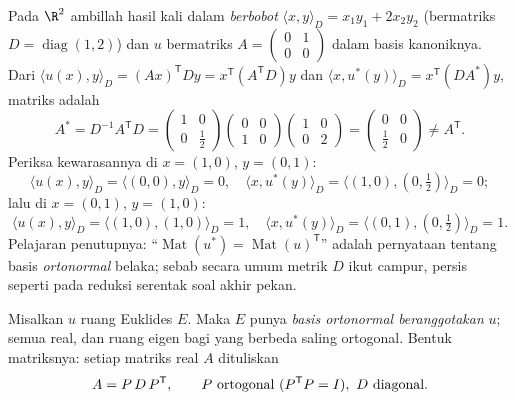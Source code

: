 \begin{example}\label{ex:b2:quadratic:weightedadjoint}
Pada $\R^2$ ambillah hasil kali dalam \emph{berbobot} $\langle x,
y\rangle_D = x_1y_1 + 2x_2y_2$ (bermatriks $D =
\operatorname{diag}(1,2)$) dan $u$ bermatriks $A =
\begin{pmatrix} 0 & 1\\ 0 & 0\end{pmatrix}$ dalam basis
kanoniknya. Dari $\langle u(x), y\rangle_D = (Ax)^{\mathsf T}Dy =
x^{\mathsf T}(A^{\mathsf T}D)y$ dan $\langle x, u^*(y)\rangle_D
= x^{\mathsf T}(DA^*)y$, matriks  adalah
\[
A^* = D^{-1}A^{\mathsf T}D
= \begin{pmatrix} 1 & 0\\ 0 & \tfrac12\end{pmatrix}
\begin{pmatrix} 0 & 0\\ 1 & 0\end{pmatrix}
\begin{pmatrix} 1 & 0\\ 0 & 2\end{pmatrix}
= \begin{pmatrix} 0 & 0\\ \tfrac12 & 0\end{pmatrix}
\neq A^{\mathsf T} .
\]
Periksa kewarasannya di $x = (1,0)$, $y = (0,1)$:
\[
\langle u(x), y\rangle_D = \langle (0,0), y\rangle_D = 0,
\quad
\langle x, u^*(y)\rangle_D
= \langle(1,0), (0,\tfrac12)\rangle_D = 0 ;
\]
lalu di $x = (0,1)$, $y = (1,0)$:
\[
\langle u(x), y\rangle_D = \langle(1,0),(1,0)\rangle_D = 1,
\quad
\langle x, u^*(y)\rangle_D =
\langle(0,1),(0,\tfrac12)\rangle_D = 1 .
\] Pelajaran penutupnya: ``$\operatorname{Mat}(u^*)
= \operatorname{Mat}(u)^{\mathsf T}$'' adalah pernyataan tentang
basis \emph{ortonormal} belaka; sebab secara umum metrik $D$
ikut campur, persis seperti pada reduksi serentak
soal akhir pekan.
\end{example}

\begin{theorem}\label{thm:b2:quadratic:spectral}
Misalkan $u$  ruang Euklides $E$. Maka
$E$ punya \emph{basis ortonormal beranggotakan } $u$; semua
 real, dan ruang eigen bagi  yang berbeda saling
ortogonal. Bentuk matriksnya: setiap matriks  real $A$ dituliskan
\[
A = P\,D\,P^{\mathsf T},
\qquad P \text{ ortogonal } (P^{\mathsf T} P = I),\ D
\text{ diagonal}.\index{teorema spektral}
\]
\end{theorem}

